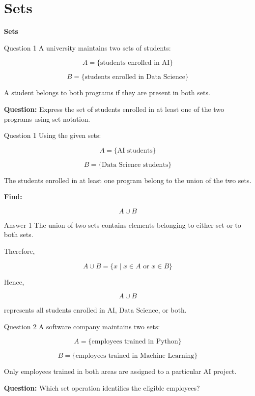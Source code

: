 \section{Sets}

\begin{frame}
\centering
\Huge\textbf{Sets}
\end{frame}


\begin{frame}{Question 1}
A university maintains two sets of students:

$$
A=\{\text{students enrolled in AI}\}
$$

$$
B=\{\text{students enrolled in Data Science}\}
$$

A student belongs to both programs if they are present in both sets.

\textbf{Question:} Express the set of students enrolled in at least one of the two programs using set notation.
\end{frame}

\begin{frame}{Question 1}
Using the given sets:

$$
A=\{\text{AI students}\}
$$

$$
B=\{\text{Data Science students}\}
$$

The students enrolled in at least one program belong to the union of the two sets.

\textbf{Find:}

$$
A\cup B
$$

\end{frame}

\begin{frame}{Answer 1}
The union of two sets contains elements belonging to either set or to both sets.

Therefore,

$$
A\cup B
=
\{x\mid x\in A\text{ or }x\in B\}
$$

Hence,

$$
\boxed{A\cup B}
$$

represents all students enrolled in AI, Data Science, or both.
\end{frame}


\begin{frame}{Question 2}
A software company maintains two sets:

$$
A=\{\text{employees trained in Python}\}
$$

$$
B=\{\text{employees trained in Machine Learning}\}
$$

Only employees trained in both areas are assigned to a particular AI project.

\textbf{Question:} Which set operation identifies the eligible employees?
\end{frame}


